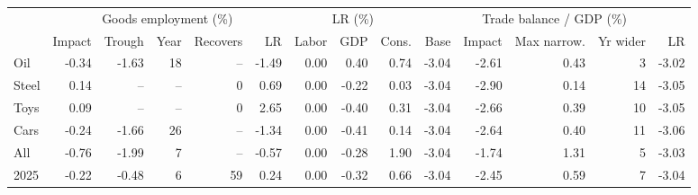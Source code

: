 \begin{tabular}{lrrrrrrrrrrrrr}
\toprule
 & \multicolumn{5}{c}{Goods employment (\%)} & \multicolumn{3}{c}{LR (\%)} & \multicolumn{5}{c}{Trade balance / GDP (\%)} \\
\cmidrule(lr){2-6}\cmidrule(lr){7-9}\cmidrule(lr){10-14}
 & Impact & Trough & Year & Recovers & LR & Labor & GDP & Cons. & Base & Impact & Max narrow. & Yr wider & LR \\
\midrule
Oil & -0.34 & -1.63 & 18 & -- & -1.49 & 0.00 & 0.40 & 0.74 & -3.04 & -2.61 & 0.43 & 3 & -3.02 \\
Steel & 0.14 & -- & -- & 0 & 0.69 & 0.00 & -0.22 & 0.03 & -3.04 & -2.90 & 0.14 & 14 & -3.05 \\
Toys & 0.09 & -- & -- & 0 & 2.65 & 0.00 & -0.40 & 0.31 & -3.04 & -2.66 & 0.39 & 10 & -3.05 \\
Cars & -0.24 & -1.66 & 26 & -- & -1.34 & 0.00 & -0.41 & 0.14 & -3.04 & -2.64 & 0.40 & 11 & -3.06 \\
All & -0.76 & -1.99 & 7 & -- & -0.57 & 0.00 & -0.28 & 1.90 & -3.04 & -1.74 & 1.31 & 5 & -3.03 \\
2025 & -0.22 & -0.48 & 6 & 59 & 0.24 & 0.00 & -0.32 & 0.66 & -3.04 & -2.45 & 0.59 & 7 & -3.04 \\
\bottomrule
\end{tabular}
